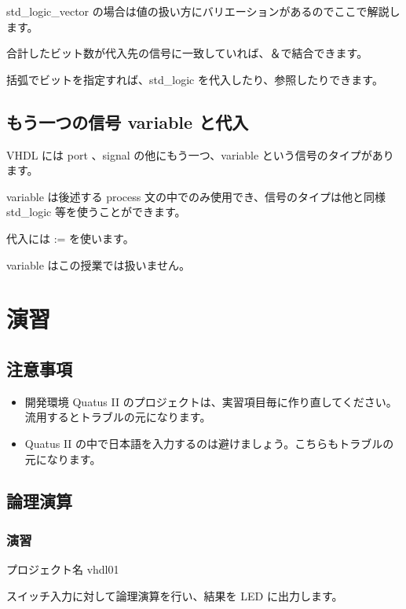 \documentclass[letterpaper,10pt,dvipdfmx]{sphinxmanual}
\begin{document}
std\_logic\_vector の場合は値の扱い方にバリエーションがあるのでここで解説します。

合計したビット数が代入先の信号に一致していれば、＆で結合できます。

括弧でビットを指定すれば、std\_logic を代入したり、参照したりできます。


\section{もう一つの信号 variable と代入}
\label{\detokenize{04_vhdl:variable}}
VHDL には port 、signal の他にもう一つ、variable という信号のタイプがあります。

variable は後述する process 文の中でのみ使用でき、信号のタイプは他と同様 std\_logic 等を使うことができます。

代入には := を使います。

variable はこの授業では扱いません。


\chapter{演習}
\label{\detokenize{05_try:id1}}\label{\detokenize{05_try::doc}}

\section{注意事項}
\label{\detokenize{05_try:id2}}\begin{itemize}
\item {} 
開発環境 Quatus II のプロジェクトは、実習項目毎に作り直してください。流用するとトラブルの元になります。

\item {} 
Quatus II の中で日本語を入力するのは避けましょう。こちらもトラブルの元になります。

\end{itemize}


\section{論理演算}
\label{\detokenize{05_try:id3}}

\subsection{演習}
\label{\detokenize{05_try:id4}}
プロジェクト名 vhdl01

スイッチ入力に対して論理演算を行い、結果を LED に出力します。
\end{document}
